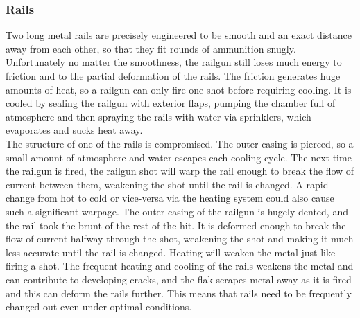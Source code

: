 \documentclass[a4paper]{article}
\begin{document}
\hspace{-18pt} \subsubsection{Rails} \label{railgun_rails} \vspace{-0.2cm}
Two long metal rails are precisely engineered to be smooth and an exact distance away from each other, so that they fit rounds of ammunition snugly. Unfortunately no matter the smoothness, the railgun still loses much energy to friction and to the partial deformation of the rails. The friction generates huge amounts of heat, so a railgun can only fire one shot before requiring cooling. It is cooled by sealing the railgun with exterior flaps, pumping the chamber full of atmosphere and then spraying the rails with water via sprinklers, which evaporates and sucks heat away.  
\\ \pbhw
{The structure of one of the rails is compromised. The outer casing is pierced, so a small amount of atmosphere and water escapes each cooling cycle. \newline \hspace{-3pt} The next time the railgun is fired, the railgun shot will warp the rail enough to break the flow of current between them, weakening the shot until the rail is changed. A rapid change from hot to cold or vice-versa via the heating system could also cause such a significant warpage.}
{The outer casing of the railgun is hugely dented, and the rail took the brunt of the rest of the hit. It is deformed enough to break the flow of current halfway through the shot, weakening the shot and making it much less accurate until the rail is changed.}
{Heating will weaken the metal just like firing a shot.}
{The frequent heating and cooling of the rails weakens the metal and can contribute to developing cracks, and the flak scrapes metal away as it is fired and this can deform the rails further. This means that rails need to be frequently changed out even under optimal conditions.}
\end{document}
